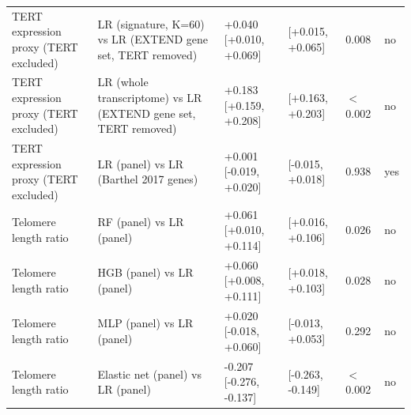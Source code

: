 \begin{longtable}{@{}>{\raggedright\arraybackslash}p{}>{\raggedright\arraybackslash}p{}p{}p{}p{}p{}@{}}
TERT expression proxy (TERT excluded) & LR (signature, K=60) vs LR (EXTEND gene set, TERT removed) & +0.040 [+0.010, +0.069] & [+0.015, +0.065] & 0.008 & no \\
TERT expression proxy (TERT excluded) & LR (whole transcriptome) vs LR (EXTEND gene set, TERT removed) & +0.183 [+0.159, +0.208] & [+0.163, +0.203] & $<$0.002 & no \\
TERT expression proxy (TERT excluded) & LR (panel) vs LR (Barthel 2017 genes) & +0.001 [-0.019, +0.020] & [-0.015, +0.018] & 0.938 & yes \\
Telomere length ratio & RF (panel) vs LR (panel) & +0.061 [+0.010, +0.114] & [+0.016, +0.106] & 0.026 & no \\
Telomere length ratio & HGB (panel) vs LR (panel) & +0.060 [+0.008, +0.111] & [+0.018, +0.103] & 0.028 & no \\
Telomere length ratio & MLP (panel) vs LR (panel) & +0.020 [-0.018, +0.060] & [-0.013, +0.053] & 0.292 & no \\
Telomere length ratio & Elastic net (panel) vs LR (panel) & -0.207 [-0.276, -0.137] & [-0.263, -0.149] & $<$0.002 & no \\
\end{longtable}

